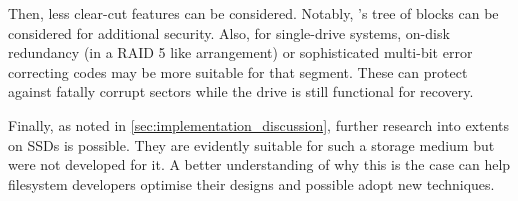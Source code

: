         Then, less clear-cut features can be considered. Notably,
        's tree of blocks can be considered for additional
        security. Also, for single-drive systems, on-disk redundancy (in a RAID
        5 like arrangement) or sophisticated multi-bit error correcting codes
        may be more suitable for that segment. These can protect against
        fatally corrupt sectors while the drive is still functional for
        recovery.


        Finally, as noted in \autoref{sec:implementation_discussion}, further
        research into extents on SSDs is possible. They are evidently suitable
        for such a storage medium but were not developed for it. A better
        understanding of why this is the case can help filesystem developers
        optimise their designs and possible adopt new techniques.
